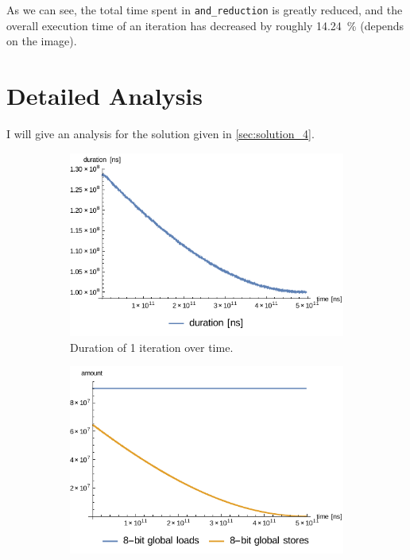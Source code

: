 \documentclass[11pt,a4paper]{article}
\begin{document}
                As we can see, the total time spent in \verb+and_reduction+ is greatly reduced, and the overall execution time of an iteration has decreased by roughly 14.24~\% (depends on the image).

    \section{Detailed Analysis}
        \label{sec:detailed_analysis}
        I will give an analysis for the solution given in \ref{sec:solution_4}.

        \begin{figure}[ht]
            \begin{subfigure}[t]{0.5\linewidth}
                \centering
                \includegraphics[width=\linewidth]{figs/black_iteration_duration_plot.pdf}
                \caption{Duration of 1 iteration over time.}
                \label{fig:black_duration_of_1_iteration_over_time}
                \vspace{4ex}
            \end{subfigure}%
            \begin{subfigure}[t]{0.5\linewidth}
                \centering
                \includegraphics[width=\linewidth]{figs/black_iteration_global_load_store_plot.pdf}

\end{subfigure}
\end{figure}
\end{document}
